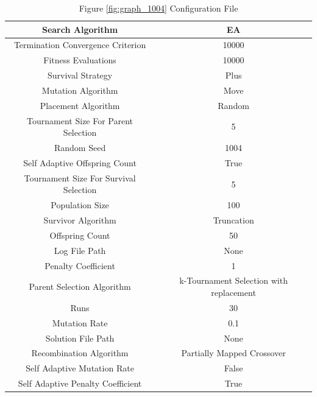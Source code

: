 \documentclass{standalone}
\begin{document}
\begin{table}[!htb]
	\centering
	\caption{Figure \ref{fig:graph_1004} Configuration File}
	\label{tab:graph_1004}
	\begin{tabular}{| c | c |}
		\hline
		Search Algorithm		& EA		 \\
		\hline
		Termination Convergence Criterion		& 10000		 \\
		\hline
		Fitness Evaluations		& 10000		 \\
		\hline
		Survival Strategy		& Plus		 \\
		\hline
		Mutation Algorithm		& Move		 \\
		\hline
		Placement Algorithm		& Random		 \\
		\hline
		Tournament Size For Parent Selection		& 5		 \\
		\hline
		Random Seed		& 1004		 \\
		\hline
		Self Adaptive Offspring Count		& True		 \\
		\hline
		Tournament Size For Survival Selection		& 5		 \\
		\hline
		Population Size		& 100		 \\
		\hline
		Survivor Algorithm		& Truncation		 \\
		\hline
		Offspring Count		& 50		 \\
		\hline
		Log File Path		& None		 \\
		\hline
		Penalty Coefficient		& 1		 \\
		\hline
		Parent Selection Algorithm		& k-Tournament Selection with replacement		 \\
		\hline
		Runs		& 30		 \\
		\hline
		Mutation Rate		& 0.1		 \\
		\hline
		Solution File Path		& None		 \\
		\hline
		Recombination Algorithm		& Partially Mapped Crossover		 \\
		\hline
		Self Adaptive Mutation Rate		& False		 \\
		\hline
		Self Adaptive Penalty Coefficient		& True		 \\
		\hline
	\end{tabular}
\end{table}
\end{document}
